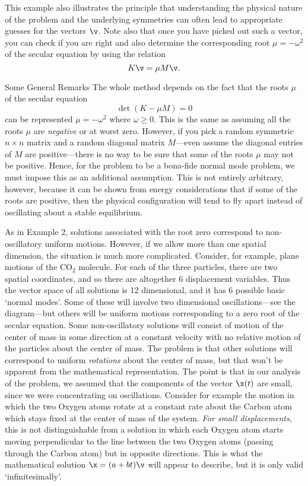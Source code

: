 This example also illustrates the principle that understanding
the physical nature of the problem and the underlying
symmetries can often lead to appropriate
guesses for the vectors $\v$.  Note also that once you have
picked out such a vector, you can check if you are right and also
determine the corresponding root $\mu = -\omega^2$ of the secular equation
by using the relation
$$
K\v = \mu M\v.
$$

\subhead Some General Remarks \endsubhead
The whole method depends on the fact that the roots $\mu$
of the secular equation
$$
\det(K - \mu M) = 0
$$
can be represented $\mu = -\omega^2$ where $\omega \ge 0$.   This
is the same as assuming all the roots $\mu$ are {\it negative\/}
or at worst zero.
However, if you pick a random symmetric $n\times n$ matrix and
a random diagonal matrix $M$---even assume the diagonal entries of
$M$ are positive---there is no way to be sure that 
some of the roots $\mu$ may not be positive.  Hence, for the problem
to be a bona-fide normal mode problem, we must impose this as
an additional assumption.   This is not entirely arbitrary,
however, because it can be shown from energy considerations that
if some of the roots are positive, then the physical configuration
will tend to fly apart instead of oscillating about a stable
equilibrium.  

As in Example 2, solutions associated with the root zero
correspond to non-oscillatory uniform motions.  However, if we
allow more than one spatial dimension, the situation is much
more complicated.   Consider, for example, plane
motions of the CO$_2$ molecule.  For each of the three
particles, there are two spatial coordinates, and so there
are altogether 6 displacement variables.  Thus the vector
space of all solutions is 12 dimensional,
and it has 6 possible basic `normal modes'.  Some
of these will involve two dimensional oscillations---see the
diagram---but others will be uniform motions corresponding to
a zero root of the secular equation.   
Some non-oscillatory solutions will consist of
  motion of the center of mass in some
direction at a constant velocity with no relative motion of the
particles about the center of mass.  
The problem is that other solutions will correspond to uniform
{\it rotations\/} about the center of mass, but that won't be apparent from
the mathematical representation.   The point is that in our analysis
of the problem, we assumed that the components of the vector $\x(t)$
are small, since we were concentrating on oscillations.  Consider
for example the motion in which the two Oxygen atoms rotate at a constant
rate about the Carbon atom which stays fixed at the center of mass
of the system.  {\it For small displacements\/}, this is not distinguishable
from a solution in which each Oxygen atom starts moving 
perpendicular to the line between the two Oxygen atoms 
(passing through  the Carbon atom) but in opposite directions. 
This is
what the mathematical solution $\x = (a + bt)\v$ will appear to
describe, but it is only valid `infinitesimally'.
\medskip
\centerline{}
\medskip

